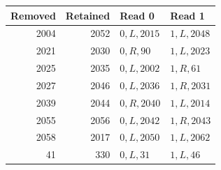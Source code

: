 \begin{center}\small
\begin{tabular}{@{}rrll@{}}
\toprule Removed & Retained & Read 0 & Read 1\\\midrule
2004&2052&$0,L,2015$&$1,L,2048$\\
2021&2030&$0,R,90$&$1,L,2023$\\
2025&2035&$0,L,2002$&$1,R,61$\\
2027&2046&$0,L,2036$&$1,R,2031$\\
2039&2044&$0,R,2040$&$1,L,2014$\\
2055&2056&$0,L,2042$&$1,R,2043$\\
2058&2017&$0,L,2050$&$1,L,2062$\\
41&330&$0,L,31$&$1,L,46$\\
\bottomrule
\end{tabular}
\end{center}
